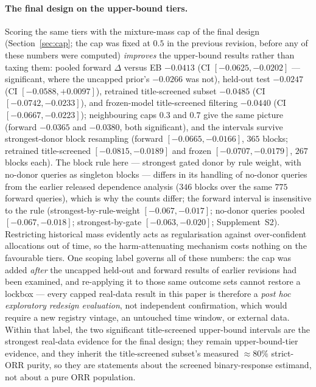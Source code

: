 \documentclass[11pt]{article}
\begin{document}
\paragraph{The final design on the upper-bound tiers.} Scoring the same
tiers with the mixture-mass cap of the final design
(Section~\ref{sec:cap}; the cap was fixed at $0.5$ in the previous revision,
before any of these numbers were computed) \emph{improves} the upper-bound
results rather than taxing them: pooled forward $\Delta$ versus EB
$-0.0413$ (CI $[-0.0625,-0.0202]$ --- significant, where the uncapped prior's
$-0.0266$ was not), held-out test $-0.0247$ (CI $[-0.0588,+0.0097]$),
retrained title-screened subset $-0.0485$ (CI $[-0.0742,-0.0233]$), and
frozen-model title-screened filtering $-0.0440$ (CI $[-0.0667,-0.0223]$);
neighbouring caps $0.3$ and $0.7$ give the same picture (forward $-0.0365$
and $-0.0380$, both significant), and the intervals survive strongest-donor
block resampling (forward $[-0.0665,-0.0166]$, $365$ blocks;
retrained title-screened $[-0.0815,-0.0189]$ and frozen $[-0.0707,-0.0179]$,
$267$ blocks each). The block rule here --- strongest gated donor by rule
weight, with no-donor queries as singleton blocks --- differs in its
handling of no-donor queries from the earlier released dependence
analysis ($346$ blocks over the same $775$ forward queries), which is why
the counts differ; the forward interval is insensitive to the rule
(strongest-by-rule-weight $[-0.067,-0.017]$; no-donor queries pooled
$[-0.067,-0.018]$; strongest-by-gate $[-0.063,-0.020]$; Supplement~S2). Restricting historical mass evidently acts
as regularisation against over-confident allocations out of time, so the
harm-attenuating mechanism costs nothing on the favourable tiers. One
scoping label governs all of these numbers: the cap was added
\emph{after} the uncapped held-out and forward results of earlier
revisions had been examined, and re-applying it to those same outcome sets
cannot restore a lockbox --- every capped real-data result in this paper
is therefore a \emph{post hoc exploratory redesign evaluation}, not
independent confirmation, which would require a new registry vintage, an
untouched time window, or external data. Within that label, the two
significant title-screened upper-bound intervals are the strongest
real-data evidence for the final design; they remain upper-bound-tier
evidence, and they inherit the title-screened subset's measured
$\approx 80\%$ strict-ORR purity, so they are statements about the
screened binary-response estimand, not about a pure ORR population.
\end{document}
